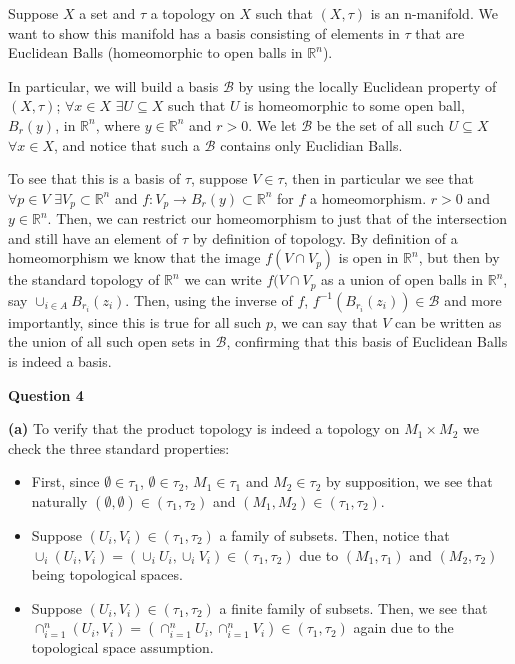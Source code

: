 \documentclass[10pt]{article}
\newcommand{\R}{\mathbb{R}}
\begin{document}
Suppose $X$ a set and $\tau$ a topology on $X$ such that $(X,\tau)$ is an n-manifold. We want to show this manifold has a basis consisting of elements in $\tau$ that are Euclidean Balls (homeomorphic to open balls in $\R^{n}$).

In particular, we will build a basis $\mathcal{B}$ by using the locally Euclidean property of $(X,\tau)$; $\forall x\in X$ $ \exists U\subseteq X$ such that $U$ is homeomorphic to some open ball, $B_{r}(y)$, in $\R^{n}$, where $y\in \R^{n}$ and $r>0$. We let $\mathcal{B}$ be the set of all such $U \subseteq X$ $\forall x \in X$, and notice that such a $\mathcal{B}$ contains only Euclidian Balls.

To see that this is a basis of $\tau$, suppose $V \in \tau$, then in particular we see that $\forall p\in V$ $\exists V_{p} \subset \R^{n}$ and $f: V_{p}\to B_{r}(y)\subset \R^{n}$ for $f$ a homeomorphism. $r > 0$ and $y\in \R^{n}$. Then, we can restrict our homeomorphism to just that of the intersection and still have an element of $\tau$ by definition of topology. By definition of a homeomorphism we know that the image $f(V\cap V_{p})$ is open in $\R^{n}$, but then by the standard topology of $\R^{n}$ we can write $f(V\cap V_{p}$ as a union of open balls in $\R^{n}$, say $\cup_{i\in A}B_{r_{i}}(z_{i})$. Then, using the inverse of $f$, $f^{-1}(B_{r_{i}}(z_{i}))\in \mathcal{B}$ and more importantly, since this is true for all such $p$, we can say that $V$ can be written as the union of all such open sets in $\mathcal{B}$, confirming that this basis of Euclidean Balls is indeed a basis.

\newpage

\textbf{Question 4}

\textbf{(a)} To verify that the product topology is indeed a topology on $M_{1} \times M_{2}$ we check the three standard properties:

\begin{itemize}
\item First, since $\emptyset \in \tau_{1}$, $\emptyset \in \tau_{2}$, $M_{1}\in \tau_{1}$ and $M_{2}\in \tau_{2}$ by supposition, we see that naturally $(\emptyset,\emptyset)\in (\tau_{1},\tau_{2})$ and $(M_{1},M_{2}) \in (\tau_{1},\tau_{2})$.
\item Suppose $(U_{i},V_{i})\in (\tau_{1},\tau_{2})$ a family of subsets. Then, notice that $\cup_{i}(U_{i},V_{i}) = (\cup_{i}U_{i},\cup_{i}V_{i})\in (\tau_{1},\tau_{2})$ due to $(M_{1},\tau_{1})$ and $(M_{2},\tau_{2})$ being topological spaces.
\item Suppose $(U_{i},V_{i})\in (\tau_{1},\tau_{2})$ a finite family of subsets. Then, we see that $\cap_{i=1}^{n}(U_{i},V_{i}) = (\cap_{i=1}^{n}U_{i},\cap_{i=1}^{n}V_{i})\in (\tau_{1},\tau_{2})$ again due to the topological space assumption.
\end{itemize}
\end{document}
